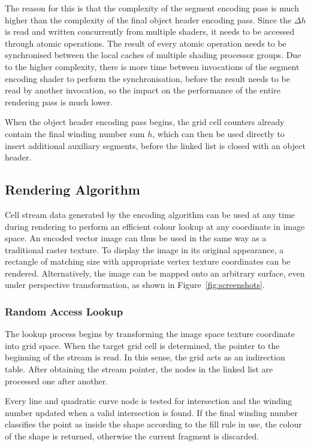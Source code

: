 \documentclass[11pt,a4paper,twoside]{article}
\begin{document}
The reason for this is that the complexity of the segment encoding pass is much higher than the complexity of the final object header encoding pass. Since the $\Delta{h}$ is read and written concurrently from multiple shaders, it needs to be accessed through atomic operations. The result of every atomic operation needs to be synchronised between the local caches of multiple shading processor groups. Due to the higher complexity, there is more time between invocations of the segment encoding shader to perform the synchronisation, before the result needs to be read by another invocation, so the impact on the performance of the entire rendering pass is much lower.

When the object header encoding pass begins, the grid cell counters already contain the final winding number sum $h$, which can then be used directly to insert additional auxiliary segments, before the linked list is closed with an object header.

\subsection {Rendering Algorithm}

Cell stream data generated by the encoding algorithm can be used at any time during rendering to perform an efficient colour lookup at any coordinate in image space. An encoded vector image can thus be used in the same way as a traditional raster texture. To display the image in its original appearance, a rectangle of matching size with appropriate vertex texture coordinates can be rendered. Alternatively, the image can be mapped onto an arbitrary surface, even under perspective transformation, as shown in Figure~\ref{fig:screenshots}.

\subsubsection{Random Access Lookup}

The lookup process begins by transforming the image space texture coordinate into grid space. When the target grid cell is determined, the pointer to the beginning of the stream is read. In this sense, the grid acts as an indirection table. After obtaining the stream pointer, the nodes in the linked list are processed one after another.

Every line and quadratic curve node is tested for intersection and the winding number updated when a valid intersection is found. If the final winding number classifies the point as inside the shape according to the fill rule in use, the colour of the shape is returned, otherwise the current fragment is discarded.
\end{document}
